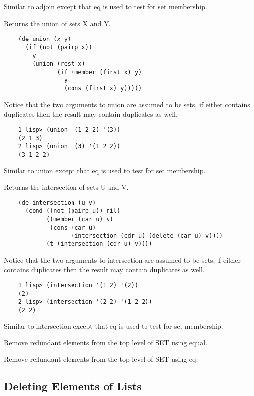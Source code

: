 {    Similar  to  adjoin  except  that eq is used to test for set
    membership.
}

{    Returns the union of sets X and Y.
}
\begin{verbatim}
    (de union (x y)
      (if (not (pairp x))
        y
        (union (rest x)
               (if (member (first x) y)
                 y
                 (cons (first x) y)))))
\end{verbatim}
    Notice that the two arguments to union  are  assumed  to  be
    sets,  if  either  contains  duplicates  then the result may
    contain duplicates as well.

\begin{verbatim}
    1 lisp> (union '(1 2 2) '(3))
    (2 1 3)
    2 lisp> (union '(3) '(1 2 2))
    (3 1 2 2)
\end{verbatim}

{    Similar to union except that eq is  used  to  test  for  set
    membership.
}

{    Returns the intersection of sets U and V.
}
\begin{verbatim}
    (de intersection (u v)
      (cond ((not (pairp u)) nil)
            ((member (car u) v)
             (cons (car u)
                   (intersection (cdr u) (delete (car u) v))))
            (t (intersection (cdr u) v))))
\end{verbatim}
    Notice that the two arguments to intersection are assumed to
    be  sets,  if either contains duplicates then the result may
    contain duplicates as well.

\begin{verbatim}
    1 lisp> (intersection '(1 2) '(2))
    (2)
    2 lisp> (intersection '(2 2) '(1 2 2))
    (2 2)
\end{verbatim}

{    Similar to intersection except that eq is used to  test  for
    set membership.
}

{    Remove  redundant  elements  from the top level of SET using
    equal.
}

{    Remove redundant elements from the top level  of  SET  using
    eq.
}
\subsection{Deleting Elements of Lists}

